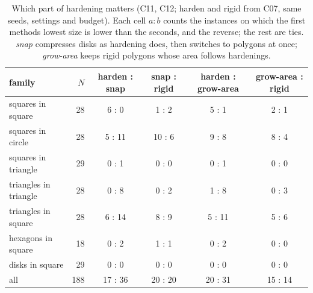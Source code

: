 \begin{table}[t]\centering\small
\begin{tabular}{lrcccc}
\toprule
family & $N$ & harden : snap & snap : rigid & harden : grow-area & grow-area : rigid \\
\midrule
squares in square & 28 & 6 : 0 & 1 : 2 & 5 : 1 & 2 : 1 \\
squares in circle & 28 & 5 : 11 & 10 : 6 & 9 : 8 & 8 : 4 \\
squares in triangle & 29 & 0 : 1 & 0 : 0 & 0 : 1 & 0 : 0 \\
triangles in triangle & 28 & 0 : 8 & 0 : 2 & 1 : 8 & 0 : 3 \\
triangles in square & 28 & 6 : 14 & 8 : 9 & 5 : 11 & 5 : 6 \\
hexagons in square & 18 & 0 : 2 & 1 : 1 & 0 : 2 & 0 : 0 \\
disks in square & 29 & 0 : 0 & 0 : 0 & 0 : 0 & 0 : 0 \\
\midrule all & 188 & 17 : 36 & 20 : 20 & 20 : 31 & 15 : 14 \\
\bottomrule
\end{tabular}
\caption{Which part of hardening matters (C11, C12; harden and rigid from C07, same seeds, settings and budget). Each cell $a:b$ counts the instances on which the first method\textquotesingle s lowest size is lower than the second\textquotesingle s, and the reverse; the rest are ties. \emph{snap} compresses disks as hardening does, then switches to polygons at once; \emph{grow-area} keeps rigid polygons whose area follows hardening\textquotesingle s.}
\label{tab:ablate}
\end{table}

